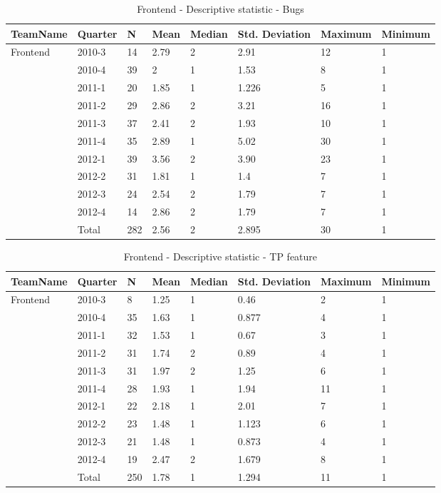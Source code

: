 \documentclass[UKenglish]{ifimaster}  %
\begin{document}
 

 \begin{table}[!htbp]
\begin{tabular}{ | l | l | l | l | l | l | l | l | }
\hline
TeamName & Quarter & N & Mean & Median & Std. Deviation & Maximum & Minimum \\ \hline
Frontend & 2010-3 & 14 & 2.79 & 2 & 2.91 & 12 & 1 \\ \hline
	 & 2010-4 & 39 & 2 & 1 & 1.53 & 8 & 1 \\ \hline
	 & 2011-1 & 20 & 1.85 & 1 & 1.226 & 5 & 1 \\ \hline
	 & 2011-2 & 29 & 2.86 & 2 & 3.21 & 16 & 1 \\ \hline
	 & 2011-3 & 37 & 2.41 & 2 & 1.93 & 10 & 1 \\ \hline
	 & 2011-4 & 35 & 2.89 & 1 & 5.02 & 30 & 1 \\ \hline
	 & 2012-1 & 39 & 3.56 & 2 & 3.90& 23 & 1 \\ \hline
	 & 2012-2 & 31 & 1.81 & 1 & 1.4 & 7 & 1 \\ \hline
	 & 2012-3 & 24 & 2.54 & 2 & 1.79 & 7 & 1 \\ \hline
	 & 2012-4 & 14 & 2.86 & 2 & 1.79 & 7 & 1 \\ \hline
	 & Total & 282 & 2.56 & 2 & 2.895 & 30 & 1 \\ \hline
	 	 \end{tabular}
  	  \caption{Frontend - Descriptive statistic - Bugs }%
\end{table}

 \begin{table}[!htbp]
\begin{tabular}{ | l | l | l | l | l | l | l | l | }
\hline
TeamName & Quarter & N & Mean & Median & Std. Deviation & Maximum & Minimum \\ \hline
Frontend & 2010-3 & 8 & 1.25 & 1 & 0.46 & 2 & 1 \\ \hline
	 & 2010-4 & 35 & 1.63 & 1 & 0.877 & 4 & 1 \\ \hline
	 & 2011-1 & 32 & 1.53 & 1 & 0.67& 3 & 1 \\ \hline
	 & 2011-2 & 31 & 1.74 & 2 & 0.89 & 4 & 1 \\ \hline
	 & 2011-3 & 31 & 1.97 & 2 & 1.25& 6 & 1 \\ \hline
	 & 2011-4 & 28 & 1.93 & 1 & 1.94& 11 & 1 \\ \hline
	 & 2012-1 & 22 & 2.18& 1 & 2.01 & 7 & 1 \\ \hline
	 & 2012-2 & 23 & 1.48 & 1 & 1.123 & 6 & 1 \\ \hline
	 & 2012-3 & 21 & 1.48 & 1 & 0.873 & 4 & 1 \\ \hline
	 & 2012-4 & 19 & 2.47 & 2 & 1.679 & 8 & 1 \\ \hline
	 & Total & 250 & 1.78 & 1 & 1.294 & 11 & 1 \\ \hline
 	 \end{tabular}
  	  \caption{Frontend - Descriptive statistic - TP feature }%
\end{table}
\end{document}
